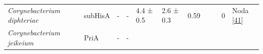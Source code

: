 \documentclass[12pt,twoside]{reedthesis}
\begin{document}
\begin{longtable}[]{@{}lllllllllll@{}}
  \begin{minipage}[t]{0.15\columnwidth}\raggedright\strut
  \emph{Corynebacterium diphteriae}\strut
  \end{minipage} & \begin{minipage}[t]{0.05\columnwidth}\raggedright\strut
  subHisA\strut
  \end{minipage} & \begin{minipage}[t]{0.04\columnwidth}\raggedright\strut
  -\strut
  \end{minipage} & \begin{minipage}[t]{0.04\columnwidth}\raggedright\strut
  -\strut
  \end{minipage} & \begin{minipage}[t]{0.06\columnwidth}\raggedright\strut
  4.4 ± 0.5\strut
  \end{minipage} & \begin{minipage}[t]{0.06\columnwidth}\raggedright\strut
  2.6 ± 0.3\strut
  \end{minipage} & \begin{minipage}[t]{0.06\columnwidth}\raggedright\strut
  0.59\strut
  \end{minipage} & \begin{minipage}[t]{0.05\columnwidth}\raggedright\strut
  \strut
  \end{minipage} & \begin{minipage}[t]{0.05\columnwidth}\raggedright\strut
  \strut
  \end{minipage} & \begin{minipage}[t]{0.03\columnwidth}\raggedright\strut
  0\strut
  \end{minipage} & \begin{minipage}[t]{0.11\columnwidth}\raggedright\strut
  Noda {[}\protect\hyperlink{ref-noda-garcia_evolution_2013}{41}{]}\strut
  \end{minipage}\tabularnewline
  \begin{minipage}[t]{0.15\columnwidth}\raggedright\strut
  \emph{Corynebacterium jeikeium}\strut
  \end{minipage} & \begin{minipage}[t]{0.05\columnwidth}\raggedright\strut
  PriA\strut
  \end{minipage} & \begin{minipage}[t]{0.04\columnwidth}\raggedright\strut
  -\strut
  \end{minipage} & \begin{minipage}[t]{0.04\columnwidth}\raggedright\strut
  -\strut
  \end{minipage} & \begin{minipage}[t]{0.06\columnwidth}\raggedright\strut

\end{minipage}
\end{longtable}
\end{document}
